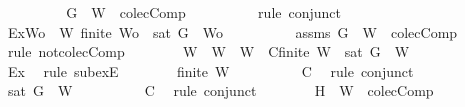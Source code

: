 \begin{isabellebody}
\ \ \ \ \ \ \isamarkupfalse%
\ \isamarkupfalse%
\ {\isachardoublequoteopen}{\isacharbraceleft}G{\isacharbraceright}\ {\isasymunion}\ W\ {\isasymnotin}\ colecComp{\isachardoublequoteclose}\isanewline
\ \ \ \ \ \ \ \ \isamarkupfalse%
\ {\isacharparenleft}rule\ conjunct{}{\isacharparenright}\isanewline
\ \ \ \ \ \ \isamarkupfalse%
\ Ex{}{\isacharcolon}{\isachardoublequoteopen}{\isasymexists}Wo\ {\isasymsubseteq}\ W{\isachardot}\ finite\ Wo\ {\isasymand}\ {\isasymnot}{\isacharparenleft}sat\ {\isacharparenleft}{\isacharbraceleft}G{\isacharbraceright}\ {\isasymunion}\ Wo{\isacharparenright}{\isacharparenright}{\isachardoublequoteclose}\isanewline
\ \ \ \ \ \ \ \ \isamarkupfalse%
\ assms\ {\isacartoucheopen}{\isacharbraceleft}G{\isacharbraceright}\ {\isasymunion}\ W\ {\isasymnotin}\ colecComp{\isacartoucheclose}\ \isamarkupfalse%
\ {\isacharparenleft}rule\ not{\isacharunderscore}colecComp{\isacharparenright}\isanewline
\ \ \ \ \ \ \isamarkupfalse%
\ W{}\ \ {\isachardoublequoteopen}W{}\ {\isasymsubseteq}\ W{\isachardoublequoteclose}\ \ C{}{\isacharcolon}{\isachardoublequoteopen}finite\ W{}\ {\isasymand}\ {\isasymnot}{\isacharparenleft}sat\ {\isacharparenleft}{\isacharbraceleft}G{\isacharbraceright}\ {\isasymunion}\ W{}{\isacharparenright}{\isacharparenright}{\isachardoublequoteclose}\isanewline
\ \ \ \ \ \ \ \ \isamarkupfalse%
\ Ex{}\ \isamarkupfalse%
\ {\isacharparenleft}rule\ subexE{\isacharparenright}\isanewline
\ \ \ \ \ \ \isamarkupfalse%
\ {\isachardoublequoteopen}finite\ W{}{\isachardoublequoteclose}\isanewline
\ \ \ \ \ \ \ \ \isamarkupfalse%
\ C{}\ \isamarkupfalse%
\ {\isacharparenleft}rule\ conjunct{}{\isacharparenright}\isanewline
\ \ \ \ \ \ \isamarkupfalse%
\ {\isachardoublequoteopen}{\isasymnot}{\isacharparenleft}sat\ {\isacharparenleft}{\isacharbraceleft}G{\isacharbraceright}\ {\isasymunion}\ W{}{\isacharparenright}{\isacharparenright}{\isachardoublequoteclose}\isanewline
\ \ \ \ \ \ \ \ \isamarkupfalse%
\ C{}\ \isamarkupfalse%
\ {\isacharparenleft}rule\ conjunct{}{\isacharparenright}\isanewline
\ \ \ \ \ \ \isamarkupfalse%
\ {\isachardoublequoteopen}{\isacharbraceleft}H{\isacharbraceright}\ {\isasymunion}\ W\ {\isasymnotin}\ colecComp{\isachardoublequoteclose}\isanewline

\end{isabellebody}
